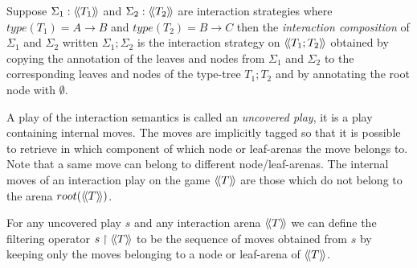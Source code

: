 \begin{dfn}
Suppose $\Sigma_1 : {\langle\!\langle T_1 \rangle\!\rangle}$ and $\Sigma_2 :
{\langle\!\langle T_2 \rangle\!\rangle}$ are interaction strategies where $type(T_1) = A \rightarrow B$
and $type(T_2) = B \rightarrow C$ then
the \emph{interaction composition} of $\Sigma_1$ and $\Sigma_2$ written $\Sigma_1 ; \Sigma_2$
is the interaction strategy on ${\langle\!\langle T_1 ; T_2 \rangle\!\rangle}$ obtained by copying the annotation of the leaves and nodes from $\Sigma_1$ and $\Sigma_2$
to the corresponding leaves and nodes of the type-tree $T_1 ; T_2$ and by annotating the root node with $\emptyset$.
\end{dfn}

A play of the interaction semantics is called an \emph{uncovered
play}, it is a play containing internal moves.
The moves are implicitly tagged so that it is possible to retrieve in which component
of which node or leaf-arenas the move belongs to. Note that a same move can belong to different node/leaf-arenas.
The internal moves of an interaction play on the game ${\langle\!\langle T \rangle\!\rangle}$ are those which do not
belong to the arena $root({\langle\!\langle T \rangle\!\rangle})$.

For any uncovered play $s$ and any interaction arena ${\langle\!\langle T \rangle\!\rangle}$
we can define the filtering operator $s\upharpoonright {\langle\!\langle T \rangle\!\rangle}$ to be the
sequence of moves obtained from $s$ by keeping only the moves
belonging to a node or leaf-arena of ${\langle\!\langle T \rangle\!\rangle}$.


